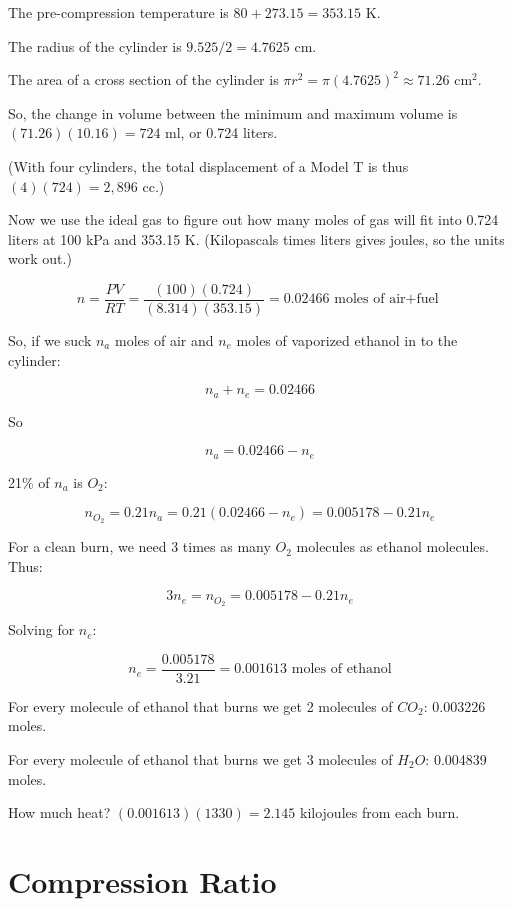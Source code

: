 \begin{Answer}[ref=fuelmix] 

The pre-compression temperature is $80 + 273.15 = 353.15$ K.

The radius of the cylinder is $9.525/2 = 4.7625$ cm.

The area of a cross section of the cylinder is $\pi r^2 = \pi (4.7625)^2 \approx 71.26$ cm$^2$.

So, the change in volume between the minimum and maximum volume is $ (71.26)(10.16) = 724$ ml, or 0.724 liters.

(With four cylinders, the total displacement of a Model T is thus $ (4)(724) = 2,896$ cc.)

Now we use the ideal gas to figure out how many moles of gas will fit into 0.724 liters at 100 kPa and 353.15 K. (Kilopascals times liters gives joules, so the units work out.)

$$n = \frac{PV}{RT} = \frac{(100)(0.724)}{(8.314)(353.15)} = 0.02466 \text{ moles of air+fuel }$$ 

So, if we suck $n_a$ moles of air and $n_e$ moles of vaporized ethanol in to the cylinder:

$$n_a + n_e = 0.02466$$

So

$$n_a = 0.02466 - n_e$$

21\% of $n_a$ is $O_2$:

$$n_{O_2} = 0.21 n_a = 0.21 (0.02466 - n_e) = 0.005178 - 0.21 n_e$$

For a clean burn, we need 3 times as many $O_2$ molecules as ethanol molecules. Thus:

$$3 n_e =  n_{O_2} = 0.005178 - 0.21 n_e$$

Solving for $n_e$:

$$n_e = \frac{0.005178}{3.21} = 0.001613 \text{ moles of ethanol}$$

For every molecule of ethanol that burns we get 2 molecules of $CO_2$: 0.003226 moles.

For every molecule of ethanol that burns we get 3 molecules of $H_2O$: 0.004839 moles.

How much heat? $(0.001613)(1330) = 2.145$ kilojoules from each burn.

\end{Answer}

\section{Compression Ratio}

